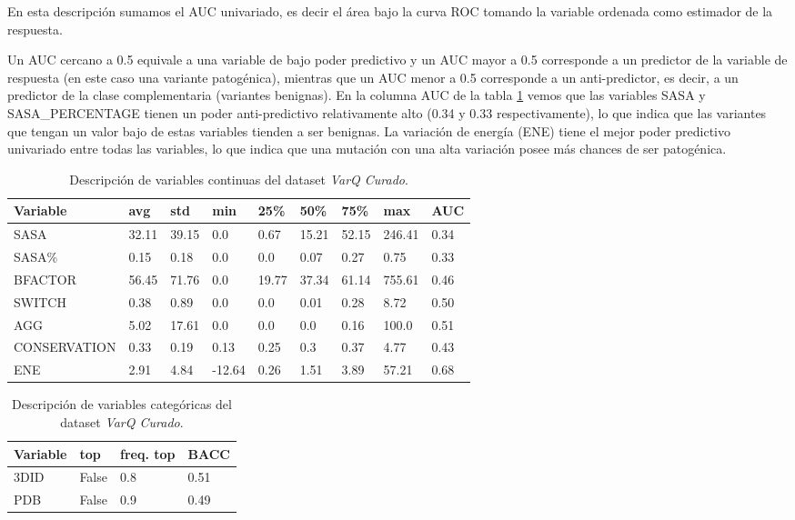 En esta descripción sumamos el AUC univariado, es decir el área bajo la curva ROC tomando la variable ordenada como estimador de la respuesta.   

Un AUC cercano a 0.5 equivale a una variable de bajo poder predictivo y un AUC mayor a 0.5 corresponde a un predictor de la variable de respuesta (en este caso una variante patogénica), mientras que un AUC menor a 0.5 corresponde a un anti-predictor, es decir, a un predictor de la clase complementaria (variantes benignas). En la columna AUC de la tabla \ref{tab:descripcion_varq_cont} vemos que las variables SASA y SASA\_PERCENTAGE tienen un poder anti-predictivo relativamente alto (0.34 y 0.33 respectivamente), lo que indica que las variantes que tengan un valor bajo de estas variables tienden a ser benignas. La variación de energía (ENE) tiene el mejor poder predictivo univariado entre todas las variables, lo que indica que una mutación con una alta variación posee más chances de ser patogénica.

\begin{table}[H]
\centering
\begin{tabular}{|l|l|l|l|l|l|l|l|l|}
\hline
Variable & avg  & std   & min    & 25\%  & 50\%  & 75\%  & max & AUC\\ \hline
SASA    & 32.11 & 39.15 & 0.0    & 0.67  & 15.21 & 52.15 & 246.41 & 0.34 \\ \hline
SASA\%  & 0.15  & 0.18  & 0.0    & 0.0   & 0.07  & 0.27  & 0.75 & 0.33  \\ \hline
BFACTOR & 56.45 & 71.76 & 0.0    & 19.77 & 37.34 & 61.14 & 755.61 & 0.46 \\ \hline
SWITCH  & 0.38  & 0.89  & 0.0    & 0.0   & 0.01  & 0.28  & 8.72 &  0.50  \\ \hline
AGG     & 5.02  & 17.61 & 0.0    & 0.0   & 0.0   & 0.16  & 100.0 &  0.51\\ \hline
CONSERVATION    & 0.33  & 0.19  & 0.13   & 0.25  & 0.3   & 0.37  & 4.77 & 0.43\\ \hline
ENE     & 2.91  & 4.84  & -12.64 & 0.26  & 1.51  & 3.89 & 57.21 & 0.68\\ \hline 
\end{tabular}
\caption{Descripción de variables continuas del dataset \textit{VarQ Curado}.}
\label{tab:descripcion_varq_cont}
\end{table}

\begin{table}[H]
\centering
\begin{tabular}{|l|l|l|l|}
\hline
Variable & top  & freq. top & BACC \\ \hline
3DID & False & 0.8 & 0.51\\ \hline
PDB  & False  & 0.9 & 0.49\\ \hline
\end{tabular}
\caption{Descripción de variables categóricas del dataset \textit{VarQ Curado}.}
\label{tab:descripcion_varq_cat}
\end{table}

